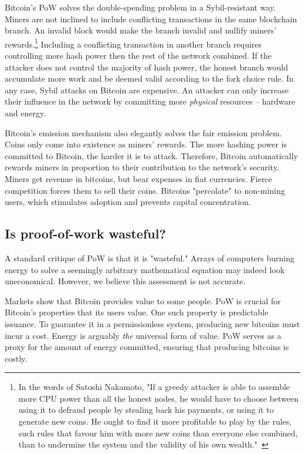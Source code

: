Bitcoin's PoW solves the double-spending problem in a Sybil-resistant way.
Miners are not inclined to include conflicting transactions in the same blockchain branch.
An invalid block would make the branch invalid and nullify miners' rewards.\footnote{In the words of Satoshi Nakamoto, "If a greedy attacker is able to assemble more CPU power than all the honest nodes, he would have to choose between using it to defraud people by stealing back his payments, or using it to generate new coins. He ought to find it more profitable to play by the rules, such rules that favour him with more new coins than everyone else combined, than to undermine the system and the validity of his own wealth."~\cite{nakamoto2008bitcoin}}
Including a conflicting transaction in another branch requires controlling more hash power then the rest of the network combined.
If the attacker does not control the majority of hash power, the honest branch would accumulate more work and be deemed valid according to the fork choice rule.
In any case, Sybil attacks on Bitcoin are expensive.
An attacker can only increase their influence in the network by committing more \textit{physical} resources -- hardware and energy.

Bitcoin's emission mechanism also elegantly solves the fair emission problem.
Coins only come into existence as miners' rewards.
The more hashing power is committed to Bitcoin, the harder it is to attack.
Therefore, Bitcoin automatically rewards miners in proportion to their contribution to the network's security.
Miners get revenue in bitcoins, but bear expenses in fiat currencies.
Fierce competition forces them to sell their coins.
Bitcoins "percolate" to non-mining users, which stimulates adoption and prevents capital concentration.


\subsection{Is proof-of-work wasteful?}

A standard critique of PoW is that it is "wasteful."
Arrays of computers burning energy to solve a seemingly arbitrary mathematical equation may indeed look uneconomical.
However, we believe this assessment is not accurate.

Markets show that Bitcoin provides value to some people.
PoW is crucial for Bitcoin's properties that its users value.
One such property is predictable issuance.
To guarantee it in a permissionless system, producing new bitcoins must incur a cost.
Energy is arguably \textit{the} universal form of value.
PoW serves as a proxy for the amount of energy committed, ensuring that producing bitcoins is costly.

